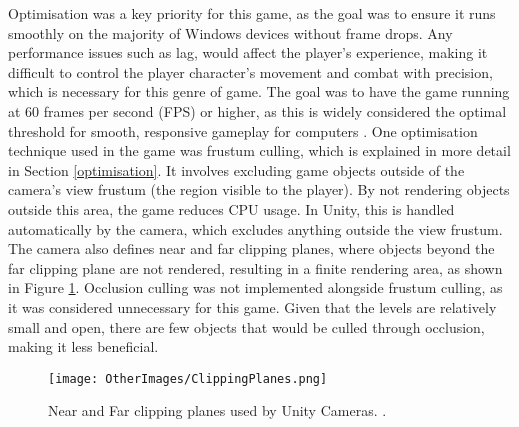 \documentclass[10pt]{final_report}
\begin{document}
Optimisation was a key priority for this game, as the goal was to ensure it runs smoothly on the majority of Windows devices without frame drops. Any performance issues such as lag, would affect the player’s experience, making it difficult to control the player character's movement and combat with precision, which is necessary for this genre of game. The goal was to have the game running at 60 frames per second (FPS) or higher, as this is widely considered the optimal threshold for smooth, responsive gameplay for computers \cite{Samuel2025}. 
\newline
One optimisation technique used in the game was frustum culling, which is explained in more detail in Section \ref{optimisation}. It involves excluding game objects outside of the camera's view frustum (the region visible to the player). By not rendering objects outside this area, the game reduces CPU usage. In Unity, this is handled automatically by the camera, which excludes anything outside the view frustum. The camera also defines near and far clipping planes, where objects beyond the far clipping plane are not rendered, resulting in  a finite rendering area, as shown in Figure \ref{cullingarea}. Occlusion culling was not implemented alongside frustum culling, as it was considered unnecessary for this game. Given that the levels are relatively small and open, there are few objects that would be culled through occlusion, making it less beneficial.

\begin{figure}[H]
    \centering
    \texttt{[image: OtherImages/ClippingPlanes.png]}
    \caption{Near and Far clipping planes used by Unity Cameras. \cite{UnityFrustum}.}
    \label{cullingarea}
\end{figure}
\end{document}
